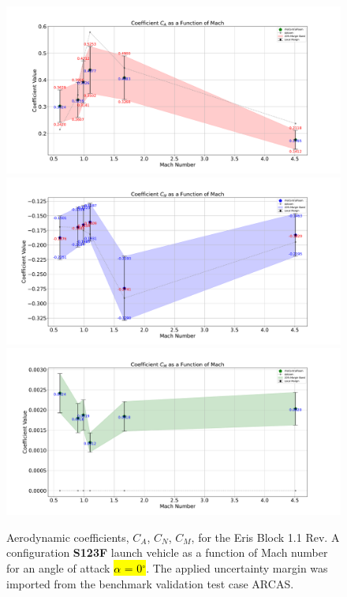 \documentclass[12pt]{article}
\begin{document}
\begin{figure}[H]
    \centering
    \vspace{-0.4cm}
    \includegraphics[width=0.995\linewidth]{figs/eris/S123F/fixed/Eris0_CA.pdf}\\
    \vspace{-0.4cm}
    \includegraphics[width=0.995\linewidth]{figs/eris/S123F/fixed/Eris0_CN.pdf}\\
    \vspace{-0.4cm}
    \includegraphics[width=0.995\linewidth]{figs/eris/S123F/fixed/Eris0_CM.pdf}
    \caption{Aerodynamic coefficients, $C_A$, $C_N$, $C_M$, for the Eris Block 1.1 Rev. A configuration \textbf{S123F} launch vehicle as a function of Mach number for an angle of attack \hl{$\alpha$ = 0$^\circ$}. The applied uncertainty margin was imported from the benchmark validation test case ARCAS.}
    \label{fig:eris-CA-CA-CM_alpha0}
\end{figure}
\end{document}
